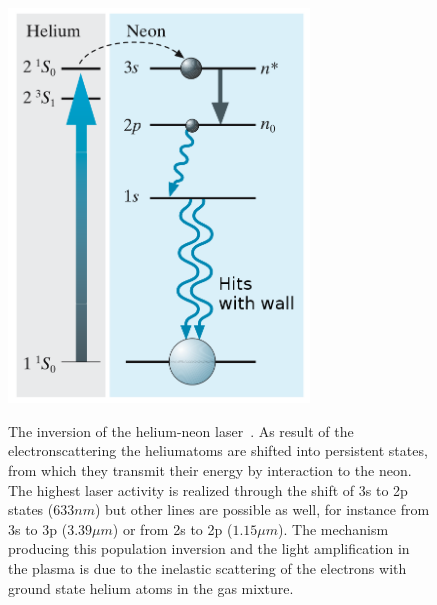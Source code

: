 \begin{figure}
    \begin{centering}
        \caption{The inversion of the helium-neon laser~\cite{christian2003gerthsen}. 
            As result of the electronscattering the
            heliumatoms are shifted into persistent states, from which they transmit their energy by
            interaction to the neon. The highest laser activity is realized
            through the shift of 3s to 2p states ($633nm$) but other lines are possible as well,
            for instance from 3s to 3p ($3.39 \mu m$) or from 2s to 2p ($1.15\mu m$). The mechanism
            producing this population inversion and the light amplification in the plasma is due
            to the inelastic scattering of the electrons with ground state helium atoms in the gas
            mixture.}
        \includegraphics[width=8cm]{figures/helium-neon-laser}
        \label{fig:integral}
    \end{centering}
\end{figure}

